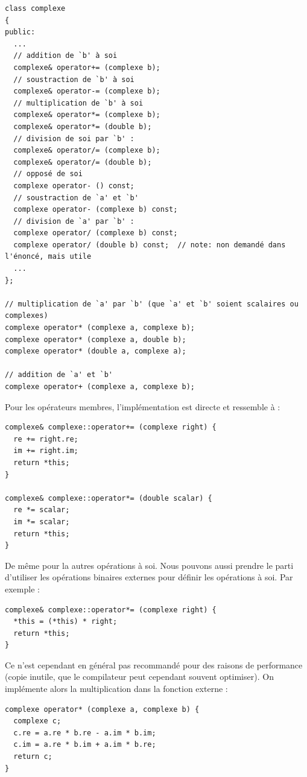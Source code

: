\documentclass{book}
\begin{document}
\begin{correction}

\begin{verbatim}
class complexe
{
public:
  ...
  // addition de `b' à soi
  complexe& operator+= (complexe b);
  // soustraction de `b' à soi
  complexe& operator-= (complexe b);
  // multiplication de `b' à soi
  complexe& operator*= (complexe b);
  complexe& operator*= (double b);
  // division de soi par `b' :
  complexe& operator/= (complexe b);
  complexe& operator/= (double b);
  // opposé de soi
  complexe operator- () const;
  // soustraction de `a' et `b'
  complexe operator- (complexe b) const;
  // division de `a' par `b' :
  complexe operator/ (complexe b) const;
  complexe operator/ (double b) const;  // note: non demandé dans l'énoncé, mais utile
  ...
};

// multiplication de `a' par `b' (que `a' et `b' soient scalaires ou complexes)
complexe operator* (complexe a, complexe b);
complexe operator* (complexe a, double b);
complexe operator* (double a, complexe a);

// addition de `a' et `b'
complexe operator+ (complexe a, complexe b);
\end{verbatim}

Pour les opérateurs membres, l'implémentation est directe et ressemble à :

\begin{verbatim}
complexe& complexe::operator+= (complexe right) {
  re += right.re;
  im += right.im;
  return *this;
}

complexe& complexe::operator*= (double scalar) {
  re *= scalar;
  im *= scalar;
  return *this;
}
\end{verbatim}

De même pour la autres opérations à soi. Nous pouvons aussi prendre le parti d'utiliser les opérations binaires externes pour définir les opérations à soi. Par exemple :

\begin{verbatim}
complexe& complexe::operator*= (complexe right) {
  *this = (*this) * right;
  return *this;
}
\end{verbatim}

Ce n'est cependant en général pas recommandé pour des raisons de performance (copie inutile, que le compilateur peut cependant souvent optimiser). On implémente alors la multiplication dans la fonction externe :

\begin{verbatim}
complexe operator* (complexe a, complexe b) {
  complexe c;
  c.re = a.re * b.re - a.im * b.im;
  c.im = a.re * b.im + a.im * b.re;
  return c;
}
\end{verbatim}


\end{correction}
\end{document}
